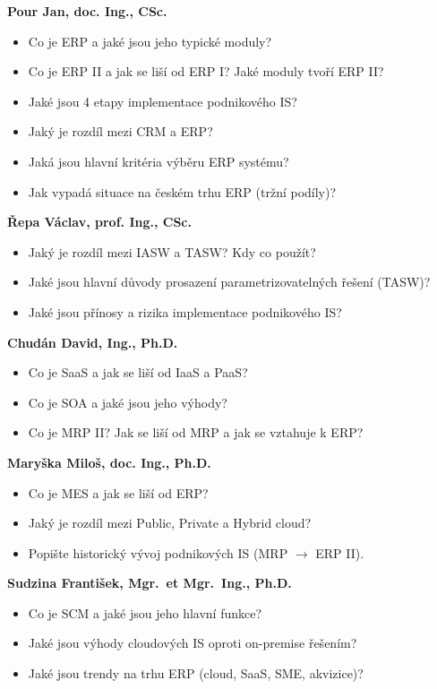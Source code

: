 \begin{profesorbox}
\textbf{Pour Jan, doc. Ing., CSc.}
\begin{itemize}
  \item Co je ERP a jaké jsou jeho typické moduly?
  \item Co je ERP II a jak se liší od ERP I? Jaké moduly tvoří ERP II?
  \item Jaké jsou 4 etapy implementace podnikového IS?
  \item Jaký je rozdíl mezi CRM a ERP?
  \item Jaká jsou hlavní kritéria výběru ERP systému?
  \item Jak vypadá situace na českém trhu ERP (tržní podíly)?
\end{itemize}
\textbf{Řepa Václav, prof. Ing., CSc.}
\begin{itemize}
  \item Jaký je rozdíl mezi IASW a TASW? Kdy co použít?
  \item Jaké jsou hlavní důvody prosazení parametrizovatelných řešení (TASW)?
  \item Jaké jsou přínosy a rizika implementace podnikového IS?
\end{itemize}
\textbf{Chudán David, Ing., Ph.D.}
\begin{itemize}
  \item Co je SaaS a jak se liší od IaaS a PaaS?
  \item Co je SOA a jaké jsou jeho výhody?
  \item Co je MRP II? Jak se liší od MRP a jak se vztahuje k ERP?
\end{itemize}
\textbf{Maryška Miloš, doc. Ing., Ph.D.}
\begin{itemize}
  \item Co je MES a jak se liší od ERP?
  \item Jaký je rozdíl mezi Public, Private a Hybrid cloud?
  \item Popište historický vývoj podnikových IS (MRP $\rightarrow$ ERP II).
\end{itemize}
\textbf{Sudzina František, Mgr.\ et Mgr.\ Ing., Ph.D.}
\begin{itemize}
  \item Co je SCM a jaké jsou jeho hlavní funkce?
  \item Jaké jsou výhody cloudových IS oproti on-premise řešením?
  \item Jaké jsou trendy na trhu ERP (cloud, SaaS, SME, akvizice)?
\end{itemize}

\end{profesorbox}
